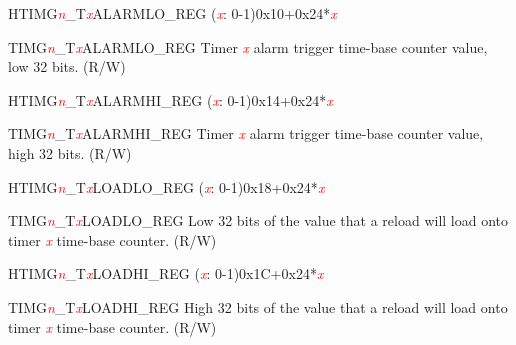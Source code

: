 \begin{register}{H}{TIMG\textcolor{red}{\it{n}}\_T\textcolor{red}{\it{x}}ALARMLO\_REG (\textcolor{red}{\it{x}}: 0-1)}{0x10+0x24*\textcolor{red}{\it{x}}}\label{regdesc:TIMERSTnALARMLOREG}
%
\regnewline%
\begin{regdesc}\begin{reglist}
\item [TIMG\textcolor{red}{\it{n}}\_T\textcolor{red}{\it{x}}ALARMLO\_REG]Timer \textcolor{red}{\it{x}} alarm trigger time-base counter value, low 32 bits. (R/W)
\end{reglist}\end{regdesc}
\end{register}


\begin{register}{H}{TIMG\textcolor{red}{\it{n}}\_T\textcolor{red}{\it{x}}ALARMHI\_REG (\textcolor{red}{\it{x}}: 0-1)}{0x14+0x24*\textcolor{red}{\it{x}}}\label{regdesc:TIMERSTnALARMHIREG}
%
\regnewline%
\begin{regdesc}\begin{reglist}
\item [TIMG\textcolor{red}{\it{n}}\_T\textcolor{red}{\it{x}}ALARMHI\_REG]Timer \textcolor{red}{\it{x}} alarm trigger time-base counter value, high 32 bits. (R/W)
\end{reglist}\end{regdesc}
\end{register}


\begin{register}{H}{TIMG\textcolor{red}{\it{n}}\_T\textcolor{red}{\it{x}}LOADLO\_REG (\textcolor{red}{\it{x}}: 0-1)}{0x18+0x24*\textcolor{red}{\it{x}}}\label{regdesc:TIMERSTnLOADLOREG}
%
\regnewline%
\begin{regdesc}\begin{reglist}
\item [TIMG\textcolor{red}{\it{n}}\_T\textcolor{red}{\it{x}}LOADLO\_REG]Low 32 bits of the value that a reload will load onto timer \textcolor{red}{\it{x}} time-base counter. (R/W)
\end{reglist}\end{regdesc}
\end{register}


\begin{register}{H}{TIMG\textcolor{red}{\it{n}}\_T\textcolor{red}{\it{x}}LOADHI\_REG (\textcolor{red}{\it{x}}: 0-1)}{0x1C+0x24*\textcolor{red}{\it{x}}}\label{regdesc:TIMERSTnLOADHIREG}
%
\regnewline%
\begin{regdesc}\begin{reglist}
\item [TIMG\textcolor{red}{\it{n}}\_T\textcolor{red}{\it{x}}LOADHI\_REG]High 32 bits of the value that a reload will load onto timer \textcolor{red}{\it{x}} time-base counter. (R/W)
\end{reglist}\end{regdesc}
\end{register}


